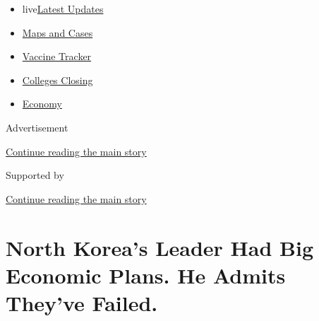\begin{itemize}
\tightlist
\item
  live\href{https://www.nytimes3xbfgragh.onion/2020/08/21/world/covid-19-coronavirus.html?name=styln-coronavirus-national\&region=TOP_BANNER\&variant=undefined\&block=storyline_menu_recirc\&action=click\&pgtype=Article\&impression_id=00e70f80-e390-11ea-8196-a386cc1d5613}{Latest
  Updates}
\item
  \href{https://www.nytimes3xbfgragh.onion/interactive/2020/us/coronavirus-us-cases.html?name=styln-coronavirus-national\&region=TOP_BANNER\&variant=undefined\&block=storyline_menu_recirc\&action=click\&pgtype=Article\&impression_id=00e70f81-e390-11ea-8196-a386cc1d5613}{Maps
  and Cases}
\item
  \href{https://www.nytimes3xbfgragh.onion/interactive/2020/science/coronavirus-vaccine-tracker.html?name=styln-coronavirus-national\&region=TOP_BANNER\&variant=undefined\&block=storyline_menu_recirc\&action=click\&pgtype=Article\&impression_id=00e73690-e390-11ea-8196-a386cc1d5613}{Vaccine
  Tracker}
\item
  \href{https://www.nytimes3xbfgragh.onion/2020/08/19/us/colleges-closing-covid.html?name=styln-coronavirus-national\&region=TOP_BANNER\&variant=undefined\&block=storyline_menu_recirc\&action=click\&pgtype=Article\&impression_id=00e73691-e390-11ea-8196-a386cc1d5613}{Colleges
  Closing}
\item
  \href{https://www.nytimes3xbfgragh.onion/live/2020/08/20/business/stock-market-today-coronavirus?name=styln-coronavirus-national\&region=TOP_BANNER\&variant=undefined\&block=storyline_menu_recirc\&action=click\&pgtype=Article\&impression_id=00e7d2d0-e390-11ea-8196-a386cc1d5613}{Economy}
\end{itemize}

Advertisement

\protect\hyperlink{after-top}{Continue reading the main story}

Supported by

\protect\hyperlink{after-sponsor}{Continue reading the main story}

\hypertarget{north-koreas-leader-had-big-economic-plans-he-admits-theyve-failed}{%
\section{North Korea's Leader Had Big Economic Plans. He Admits They've
Failed.}\label{north-koreas-leader-had-big-economic-plans-he-admits-theyve-failed}}

